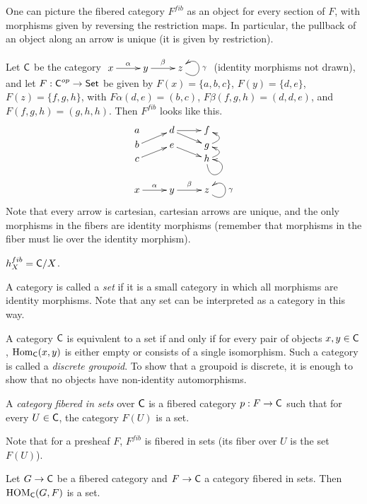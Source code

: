  One can picture the fibered category $F^{fib}$ as an object for every section of $F$,
 with morphisms given by reversing the restriction maps. In particular, the pullback of
 an object along an arrow is unique (it is given by restriction).
 \begin{example}
   Let $\text{\sf C}$ be the category $\xymatrix{x\ar[r]^\alpha& y
   \ar[r]^\beta & z\ar@(rd,ru)_\gamma}$ (identity morphisms not drawn), and let
   $F:\text{\sf C}^{op}\to \text{\sf Set}$ be given by $F(x)=\{a,b,c\}$, $F(y)=\{d,e\}$, $F(z)=\{f,g,h\}$,
   with $F\alpha (d,e)=(b,c)$, $F\beta(f,g,h)=(d,d,e)$, and $F(f,g,h)=(g,h,h)$. Then
   $F^{fib}$ looks like this.
   \[\xymatrix@R-2pc{
    a & d \ar[r] \ar[rd]& f \\
    b \ar[ru] & e \ar[rd] & g \ar@/_3ex/[u] \\
    c \ar[ru] &   & h \ar@/_3ex/[u] \ar@(d,r) \\ \rule{0pt}{3ex} \\
    x\ar[r]^\alpha & y\ar[r]^\beta & z\ar@(dr,ru)_\gamma
   }\]
   Note that every arrow is cartesian, cartesian arrows are unique, and the only
   morphisms in the fibers are identity morphisms (remember that morphisms in the fiber
   must lie over the identity morphism).
 \end{example}
 \begin{example}
   $h_X^{fib}=\text{\sf C}/X$.
 \end{example}
 \begin{definition}
   A category is called a \emph{set} if it is a small category in which all morphisms are
   identity morphisms. Note that any set can be interpreted as a category in this way.
 \end{definition}
 \begin{remark}
   A category $\text{\sf C}$ is equivalent to a set if and only if for every pair of objects
   $x,y\in \text{\sf C}$, $\operatorname{Hom}_{\text{\sf C}}(x,y)$ is either empty or consists of a single isomorphism. Such
   a category is called a \emph{discrete groupoid}. To show that a groupoid is discrete,
   it is enough to show that no objects have non-identity automorphisms.
 \end{remark}
 \begin{definition}
   A \emph{category fibered in sets} over $\text{\sf C}$ is a fibered category $p:F\to \text{\sf C}$ such that
   for every $U\in \text{\sf C}$, the category $F(U)$ is a set.
 \end{definition}
 Note that for a presheaf $F$, $F^{fib}$ is fibered in sets (its fiber over $U$ is the
 set $F(U)$).
 \begin{lemma}
   Let $G\to \text{\sf C}$ be a fibered category and $F\to \text{\sf C}$ a category fibered in sets. Then
   $\operatorname{HOM}_{\text{\sf C}}(G,F)$ is a set.
 \end{lemma}
